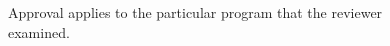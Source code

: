 \begin{figure}[H]
\centering
{}
\caption{Approval applies to the particular program that the reviewer examined.}\label{fig:teach-M07-12}
\end{figure}
